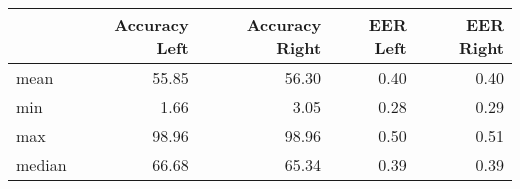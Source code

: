 \begin{tabular}{lrrrr}
\toprule
{} &  Accuracy Left &  Accuracy Right &  EER Left &  EER Right \\
\midrule
mean   &          55.85 &           56.30 &      0.40 &       0.40 \\
min    &           1.66 &            3.05 &      0.28 &       0.29 \\
max    &          98.96 &           98.96 &      0.50 &       0.51 \\
median &          66.68 &           65.34 &      0.39 &       0.39 \\
\bottomrule
\end{tabular}

